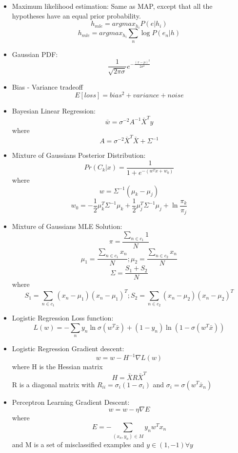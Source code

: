 \documentclass[parskip=half]{scrartcl}
\begin{document}
\begin{itemize}
        \item 
        Maximum likelihood estimation:
        Same as MAP, except that all the hypotheses have an equal prior probability.
        $$h_{mle} = argmax_{h_i} P(e|h_i)$$
        $$h_{mle} = argmax_{h_i} \sum_n \log P(e_n|h)$$

        \item 
        Gaussian PDF:
        $$\frac{1}{\sqrt{2\pi\sigma}} e^{- \frac{(x - \mu)^2}{2 \sigma^2}}$$

        \item 
        Bias - Variance tradeoff
        $$E[loss] = bias^2 + variance + noise$$

        \item 
        Bayesian Linear Regression:
        $$\bar{w} = \sigma^{-2} A^{-1} \bar{X}^T y $$
        where
        $$A = \sigma^{-2} \bar{X}^T \bar{X} + \Sigma^{-1}$$

        \item 
        Mixture of Gaussians Posterior Distribution:
        $$Pr(C_k|x) = \frac{1}{1 + e^{-(w^Tx + w_0)}}$$
        where
        $$w = \Sigma^{-1} (\mu_k - \mu_j)$$
        $$w_0 = -\frac{1}{2} \mu_k^T \Sigma^{-1} \mu_k + \frac{1}{2} \mu_j^T \Sigma^{-1} \mu_j + \ln\frac{\pi_k}{\pi_j}$$

        \item 
        Mixture of Gaussians MLE Solution:
        $$\pi = \frac{\sum_{n \in c_1} 1}{N}$$
        $$\mu_1 = \frac{\sum_{n \in c_1} x_n}{N}; \mu_2 = \frac{\sum_{n \in c_2} x_n}{N}$$
        $$\Sigma = \frac{S_1 + S_2}{N}$$
        where 
        $$S_1 = \sum_{n \in c_1} (x_n - \mu_1) (x_n - \mu_1)^T; S_2 = \sum_{n \in c_2} (x_n - \mu_2) (x_n - \mu_2)^T$$

        \item 
        Logistic Regression Loss function:
        $$L(w) = - \sum_n y_n \ln \sigma(w^T \bar{x}) + (1 - y_n) \ln (1 - \sigma(w^T \bar{x})) $$

        \item 
        Logistic Regression Gradient descent:
        $$w = w - H^{-1} \nabla L(w)$$
        where H is the Hessian matrix
        $$H = \bar{X} R \bar{X}^T$$
        R is a diagonal matrix with $R_{ii} = \sigma_i(1 - \sigma_i)$ and $\sigma_i = \sigma(w^T \bar{x}_n)$

        \item 
        Perceptron Learning Gradient Descent:
        $$w = w - \eta \nabla E$$
        where $$E = - \sum_{(x_n, y_n) \in M} y_n w^T x_n$$
        and M is a set of misclassified examples and $y \in (1, -1) \forall y$


\end{itemize}
\end{document}
